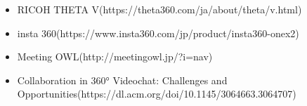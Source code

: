 \begin{itemize}
  \item RICOH THETA V(https://theta360.com/ja/about/theta/v.html)
  \item insta 360(https://www.insta360.com/jp/product/insta360-onex2)
  \item Meeting OWL(http://meetingowl.jp/?i=nav)
  \item Collaboration in 360° Videochat: Challenges and Opportunities(https://dl.acm.org/doi/10.1145/3064663.3064707)
\end{itemize}